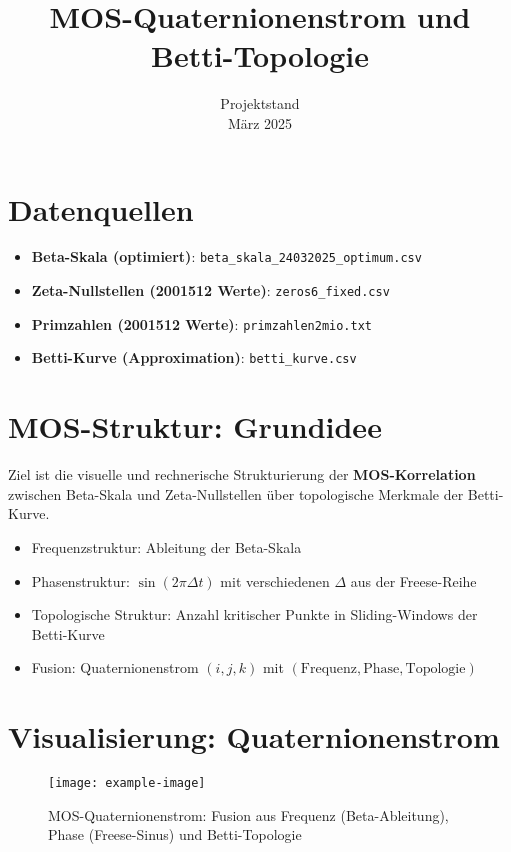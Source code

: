 \documentclass[a4paper,11pt]{article}
\title{MOS-Quaternionenstrom und Betti-Topologie}
\author{Projektstand \\ \small März 2025}
\date{}
\begin{document}
\maketitle

\section{Datenquellen}

\begin{itemize}
    \item \textbf{Beta-Skala (optimiert)}: \texttt{beta\_skala\_24032025\_optimum.csv}
    \item \textbf{Zeta-Nullstellen (2001512 Werte)}: \texttt{zeros6\_fixed.csv}
    \item \textbf{Primzahlen (2001512 Werte)}: \texttt{primzahlen2mio.txt}
    \item \textbf{Betti-Kurve (Approximation)}: \texttt{betti\_kurve.csv}
\end{itemize}

\section{MOS-Struktur: Grundidee}

Ziel ist die visuelle und rechnerische Strukturierung der \textbf{MOS-Korrelation} zwischen Beta-Skala und Zeta-Nullstellen über topologische Merkmale der Betti-Kurve.

\begin{itemize}
    \item Frequenzstruktur: Ableitung der Beta-Skala
    \item Phasenstruktur: $\sin(2\pi \Delta t)$ mit verschiedenen $\Delta$ aus der Freese-Reihe
    \item Topologische Struktur: Anzahl kritischer Punkte in Sliding-Windows der Betti-Kurve
    \item Fusion: Quaternionenstrom $(i, j, k)$ mit $(\text{Frequenz}, \text{Phase}, \text{Topologie})$
\end{itemize}

\section{Visualisierung: Quaternionenstrom}

\begin{figure}[h!]
    \centering
    \texttt{[image: example-image]}
    \caption{MOS-Quaternionenstrom: Fusion aus Frequenz (Beta-Ableitung), Phase (Freese-Sinus) und Betti-Topologie}
\end{figure}
\end{document}
